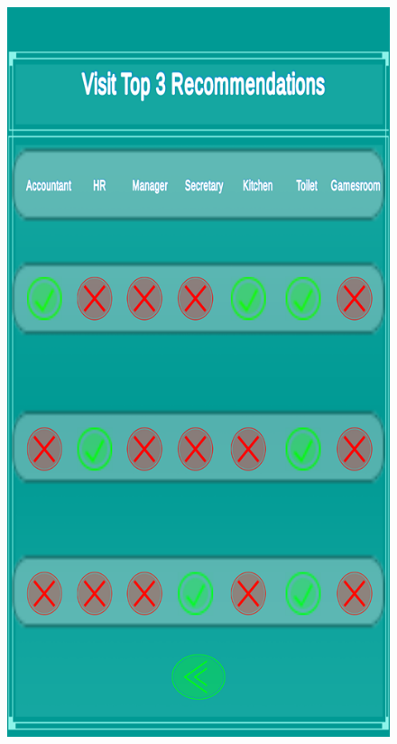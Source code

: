 \documentclass{aifyp}
\begin{document}
\begin{appendices}
\begin{figure}[H]
\begin{minipage}{.5\textwidth}
          \label{fig:TaskMenu}
        \end{minipage}%
        \begin{minipage}{.5\textwidth}
          \centering
          \includegraphics[scale=0.45]{Images/Chapter5/Impl1.png}

\end{minipage}
\end{figure}
\end{appendices}
\end{document}
